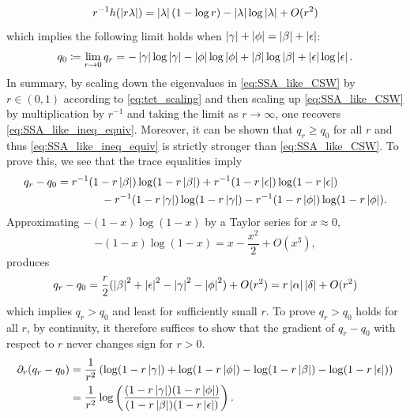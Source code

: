 \documentclass[notitlepage, 10pt]{article}
\begin{document}
\begin{equation}
    r^{-1}h(\left|r\lambda\right|) = \left|\lambda\right|(1-\log r) - \left|\lambda\right| \log \left|\lambda\right| + O(r^2)
\end{equation}
which implies the following limit holds when $\left|\gamma\right| + \left|\phi\right| = \left|\beta\right| + \left|\epsilon\right|$:
\begin{equation}
    q_0 \coloneqq 
    \lim_{r \to 0} q_{r}  
    =
    -\left|\gamma\right|\log\left|\gamma\right|
    -\left|\phi\right|\log\left|\phi\right|
    +\left|\beta\right|\log\left|\beta\right|
    +\left|\epsilon\right|\log\left|\epsilon\right|.
\end{equation}
In summary, by scaling down the eigenvalues in \cref{eq:SSA_like_CSW} by $r \in (0,1)$ according to \cref{eq:tet_scaling} and then scaling up \cref{eq:SSA_like_CSW} by multiplication by $r^{-1}$ and taking the limit as $r \to \infty$, one recovers \cref{eq:SSA_like_ineq_equiv}.
Moreover, it can be shown that $q_{r} \geq q_{0}$ for all $r$ and thus \cref{eq:SSA_like_ineq_equiv} is strictly stronger than \cref{eq:SSA_like_CSW}.
To prove this, we see that the trace equalities imply
\begin{align}
    \begin{split}
        q_{r}-q_{0}
        &= r^{-1}(1-r\left|\beta\right|)\log(1-r\left|\beta\right|)+r^{-1}(1-r\left|\epsilon\right|)\log(1-r\left|\epsilon\right|)\\
        &\qquad\qquad-r^{-1}(1-r\left|\gamma\right|)\log(1-r\left|\gamma\right|)-r^{-1}(1-r\left|\phi\right|)\log(1-r\left|\phi\right|).
    \end{split}
\end{align}
Approximating $-(1-x)\log(1-x)$ by a Taylor series for $x \approx 0$,
\begin{equation}
    -(1-x)\log(1-x) = x - \frac{x^2}{2} + O(x^3),
\end{equation}
produces
\begin{equation}
    q_{r} - q_{0} = \frac{r}{2}(\left|\beta\right|^2 + \left|\epsilon\right|^{2} - \left|\gamma\right|^{2} - \left|\phi\right|^{2}) + O(r^2) = r \left|\alpha\right| \left|\delta\right| + O(r^2)
\end{equation}
which implies $q_{r} > q_0$ and least for sufficiently small $r$.
To prove $q_{r} > q_0$ holds for all $r$, by continuity, it therefore suffices to show that the gradient of $q_{r} - q_{0}$ with respect to $r$ never changes sign for $r > 0$.
\begin{align}
    \begin{split}
        \partial_{r} (q_{r}-q_{0})
        &= \frac{1}{r^2} \left(\log(1-r\left|\gamma\right|)+\log(1-r\left|\phi\right|)-\log(1-r\left|\beta\right|)-\log(1-r\left|\epsilon\right|) \right)\\
        &= \frac{1}{r^2} \log\left(\frac{(1-r\left|\gamma\right|)(1-r\left|\phi\right|)}{(1-r\left|\beta\right|)(1-r\left|\epsilon\right|)} \right).
    \end{split}
\end{align}
\end{document}
